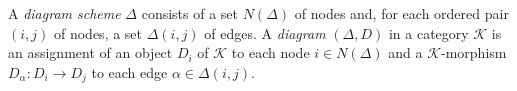 A \emph{diagram scheme} $\Delta$ consists of a set $N(\Delta)$ of nodes and, for each ordered pair $(i, j)$ of nodes, a set $\Delta(i, j)$ of edges. A \emph{diagram} $(\Delta, D)$ in a category $\mathcal{K}$ is an assignment of an object $D_i$ of $\mathcal{K}$ to each node $i \in N(\Delta)$ and a $\mathcal{K}$-morphism $D_\alpha: D_i \longrightarrow D_j$ to each edge $\alpha \in \Delta(i, j)$.
